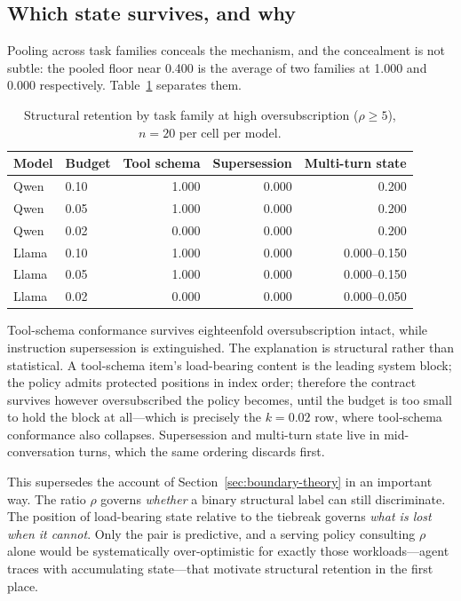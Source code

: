 \subsection{Which state survives, and why}
\label{sec:sweep-mechanism}

Pooling across task families conceals the mechanism, and the concealment is not
subtle: the pooled floor near 0.400 is the average of two families at 1.000 and
0.000 respectively.  Table~\ref{tab:dissoc} separates them.

\begin{table}[!htbp]
  \centering
  \caption{Structural retention by task family at high oversubscription
  ($\rho\ge5$), $n=20$ per cell per model.}
  \label{tab:dissoc}
  \begin{tabular}{llrrr}
    \toprule
    Model & Budget & Tool schema & Supersession & Multi-turn state \\
    \midrule
    Qwen  & 0.10 & 1.000 & 0.000 & 0.200 \\
    Qwen  & 0.05 & 1.000 & 0.000 & 0.200 \\
    Qwen  & 0.02 & 0.000 & 0.000 & 0.200 \\
    Llama & 0.10 & 1.000 & 0.000 & 0.000--0.150 \\
    Llama & 0.05 & 1.000 & 0.000 & 0.000--0.150 \\
    Llama & 0.02 & 0.000 & 0.000 & 0.000--0.050 \\
    \bottomrule
  \end{tabular}
\end{table}

Tool-schema conformance survives eighteenfold oversubscription intact, while
instruction supersession is extinguished.  The explanation is structural rather
than statistical.  A tool-schema item's load-bearing content is the leading
system block; the policy admits protected positions in index order; therefore
the contract survives however oversubscribed the policy becomes, until the
budget is too small to hold the block at all---which is precisely the
$k=0.02$ row, where tool-schema conformance also collapses.  Supersession and
multi-turn state live in mid-conversation turns, which the same ordering
discards first.

This supersedes the account of Section~\ref{sec:boundary-theory} in an important
way.  The ratio $\rho$ governs \emph{whether} a binary structural label can still
discriminate.  The position of load-bearing state relative to the tiebreak
governs \emph{what is lost when it cannot}.  Only the pair is predictive, and a
serving policy consulting $\rho$ alone would be systematically over-optimistic
for exactly those workloads---agent traces with accumulating state---that
motivate structural retention in the first place.

